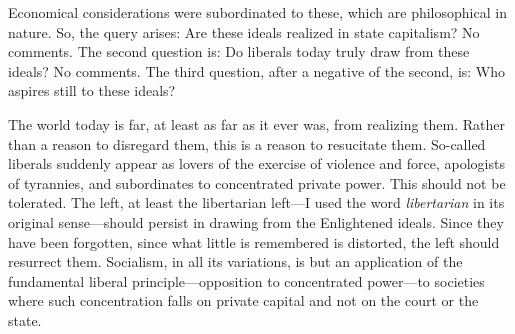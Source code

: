 \documentclass[a4paper]{article}
\begin{document}
Economical considerations were subordinated to these, which are philosophical
in nature. So, the query arises: Are these ideals realized in state capitalism?
No comments. The second question is: Do liberals today truly draw from these
ideals? No comments. The third question, after a negative of the second, is:
Who aspires still to these ideals? 

The world today is far, at least as far as it ever was, from realizing them.
Rather than a reason to disregard them, this is a reason to resucitate them.
So-called liberals suddenly appear as lovers of the exercise of violence and
force, apologists of tyrannies, and subordinates to concentrated private power.
This should not be tolerated. The left, at least the libertarian left---I used
the word \textit{libertarian} in its original sense---should persist in drawing
from the Enlightened ideals. Since they have been forgotten, since what little
is remembered is distorted, the left should resurrect them. Socialism, in
all its variations, is but an application of the fundamental liberal
principle---opposition to concentrated power---to societies where such
concentration falls on private capital and not on the court or the state.
\end{document}

